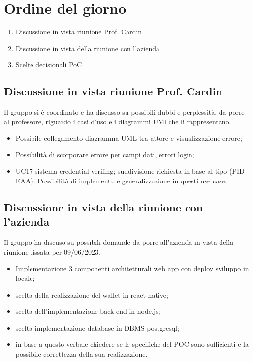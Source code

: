 \section{Ordine del giorno}
\begin{enumerate}
\item Discussione in vista riunione Prof. Cardin
\item Discussione in vista della riunione con l'azienda 
\item Scelte decisionali PoC
\end{enumerate}

\subsection{Discussione in vista riunione Prof. Cardin}
Il gruppo si è coordinato e ha discusso su possibili dubbi e perplessità, da porre al professore, riguardo i casi d'uso e i diagrammi UMl che li rappresentano.
\begin{itemize}
    \item Possibile collegamento diagramma UML tra attore e visualizzazione errore;
    \item Possibilità di scorporare errore per campi dati, errori login;
    \item UC17 sistema credential verifing; suddivisione richiesta in base al tipo (PID EAA). Possibilità di implementare generalizzazione in questi use case.
\end{itemize}

\subsection{Discussione in vista della riunione con l'azienda}
Il gruppo ha discuso su possibili domande da porre all'azienda in vista della riunione fissata per 09/06/2023.
\begin{itemize}
\item Implementazione 3 componenti architetturali web app con deploy sviluppo in locale;
\item scelta della realizzazione del wallet in react native;
\item scelta dell'implementazione back-end in node.js;
\item scelta implementazione database in DBMS postgresql;
\item in base a questo verbale chiedere se le specifiche del POC sono sufficienti e la possibile correttezza della sua realizzazione.
\end{itemize}
